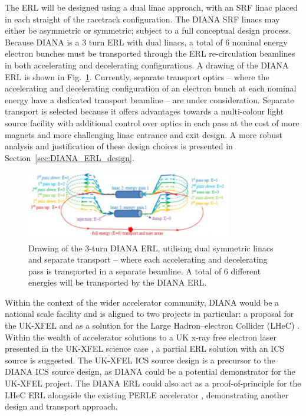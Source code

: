 \documentclass[../main.tex]{subfiles}
\begin{document}
The ERL will be designed using a dual linac approach, with an SRF linac placed in each straight of the racetrack configuration. The DIANA SRF linacs may either be asymmetric or symmetric; subject to a full conceptual design process. Because DIANA is a 3 turn ERL with dual linacs, a total of 6 nominal energy electron bunches must be transported through the ERL re-circulation beamlines in both accelerating and decelerating configurations. A drawing of the DIANA ERL is shown in Fig.~\ref{fig:DIANA_ERL_diagram}. Currently, separate transport optics -- where the accelerating and decelerating configuration of an electron bunch at each nominal energy have a dedicated transport beamline -- are under consideration. Separate transport is selected because it offers advantages towards a multi-colour light source facility with additional control over optics in each pass at the cost of more magnets and more challenging linac entrance and exit design. A more robust analysis and justification of these design choices is presented in Section~\ref{sec:DIANA_ERL_design}. 
\begin{figure}[!h]
\centering
\includegraphics[width=0.8\textwidth]{Figures/DIANA_Inverse_Compton_Source_Design/DIANA_diagram_placeholder.pdf}
\caption{Drawing of the 3-turn DIANA ERL, utilising dual symmetric linacs and separate transport -- where each accelerating and decelerating pass is transported in a separate beamline. A total of 6 different energies will be transported by the DIANA ERL.}
\label{fig:DIANA_ERL_diagram}
\end{figure}
Within the context of the wider accelerator community, DIANA would be a national scale facility and is aligned to two projects in particular: a proposal for the UK-XFEL \cite{burnett2020uk} and as a solution for the Large Hadron--electron Collider (LHeC) \cite{valloni2013strawman,bruning2019exploring,holzer2021accelerator,agostini2021large}. Within the wealth of accelerator solutions to a UK x-ray free electron laser presented in the UK-XFEL science case \cite{burnett2020uk}, a partial ERL solution with an ICS source is suggested. The UK-XFEL ICS source design is a precursor to the DIANA ICS source design, as DIANA could be a potential demonstrator for the UK-XFEL project. The DIANA ERL could also act as a proof-of-principle for the LHeC ERL alongside the existing PERLE accelerator \cite{angal2018perle}, demonstrating another design and transport approach.
\end{document}
